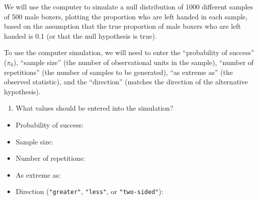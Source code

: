 \documentclass[
]{report}
\providecommand{\tightlist}{%
  \setlength{\itemsep}{0pt}\setlength{\parskip}{0pt}}
\begin{document}
We will use the computer to simulate a null distribution of 1000 different samples of 500 male boxers, plotting the proportion who are left handed in each sample, based on the assumption that the true proportion of male boxers who are left handed is 0.1 (or that the null hypothesis is true).

To use the computer simulation, we will need to enter the ``probability of success'' (\(\pi_0\)), ``sample size'' (the number of observational units in the sample), ``number of repetitions'' (the number of samples to be generated), ``as extreme as'' (the observed statistic), and the ``direction'' (matches the direction of the alternative hypothesis).

\begin{enumerate}
\def\labelenumi{\arabic{enumi}.}
\setcounter{enumi}{17}
\tightlist
\item
  What values should be entered into the simulation?
\end{enumerate}

\vspace{.2in}

\begin{itemize}
\tightlist
\item
  Probability of success:
\end{itemize}

\vspace{.2in}

\begin{itemize}
\tightlist
\item
  Sample size:
\end{itemize}

\vspace{.2in}

\begin{itemize}
\tightlist
\item
  Number of repetitions:
\end{itemize}

\vspace{.2in}

\begin{itemize}
\tightlist
\item
  As extreme as:
\end{itemize}

\vspace{.2in}

\begin{itemize}
\tightlist
\item
  Direction (\texttt{"greater"}, \texttt{"less"}, or \texttt{"two-sided"}):
\end{itemize}
\end{document}
